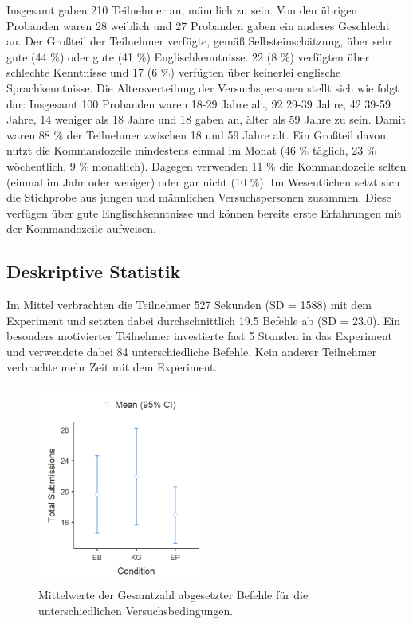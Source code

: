 Insgesamt gaben 210 Teilnehmer an, männlich zu sein. Von den übrigen Probanden waren 28 weiblich und 27 Probanden gaben ein anderes Geschlecht an. Der Großteil der Teilnehmer verfügte, gemäß Selbsteinschätzung, über sehr gute (44 \%) oder gute (41 \%) Englischkenntnisse. 22 (8 \%) verfügten über schlechte Kenntnisse und 17 (6 \%) verfügten über keinerlei englische Sprachkenntnisse. Die Altersverteilung der Versuchspersonen stellt sich wie folgt dar: Insgesamt 100 Probanden waren 18-29 Jahre alt, 92  29-39 Jahre,  42 39-59 Jahre, 14 weniger als 18 Jahre und 18 gaben an, älter als 59 Jahre zu sein. Damit waren 88 \% der Teilnehmer zwischen 18 und 59 Jahre alt. Ein Großteil davon nutzt die Kommandozeile mindestens einmal im Monat (46 \% täglich, 23 \% wöchentlich, 9 \% monatlich). Dagegen verwenden 11 \% die Kommandozeile selten (einmal im Jahr oder weniger) oder gar nicht (10 \%). Im Wesentlichen setzt sich die Stichprobe aus jungen und männlichen Versuchspersonen zusammen. Diese verfügen über gute Englischkenntnisse und können bereits erste Erfahrungen mit der Kommandozeile aufweisen.

\subsection{Deskriptive Statistik}
Im Mittel verbrachten die Teilnehmer 527 Sekunden (SD = 1588) mit dem Experiment und setzten dabei durchschnittlich 19.5 Befehle ab (SD = 23.0). Ein besonders motivierter Teilnehmer investierte fast 5 Stunden in das Experiment und verwendete dabei 84 unterschiedliche Befehle. Kein anderer Teilnehmer verbrachte mehr Zeit mit dem Experiment.

\begin{figure}[htbp]
    \centering
    \includegraphics[width=0.5\textwidth]{img/auswertung/mean_subs.png}
    \caption{Mittelwerte der Gesamtzahl abgesetzter Befehle für die unterschiedlichen Versuchsbedingungen.}
    \label{mean_subs}
\end{figure}

